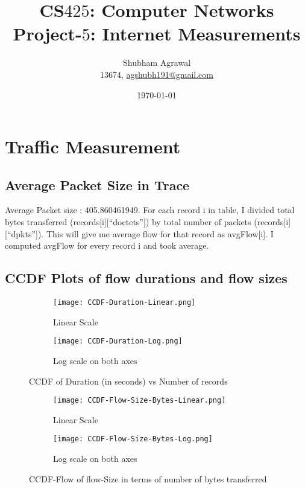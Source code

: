 \documentclass[11pt,a4paper,titlepage]{article}
\title{\blue CS$425$: Computer Networks \\
\blueb Project-$5$: Internet Measurements}
\author{Shubham Agrawal \\
13674, \href{mailto:agshubh191@gmail.com}{agshubh191@gmail.com}}
\date{\today}
\begin{document}
\maketitle
\section{Traffic Measurement}
\subsection{Average Packet Size in Trace}
Average Packet size : 405.860461949. For each record i in table, I divided total bytes transferred (records[i][“doctets”]) by total number of packets (records[i][“dpkts”]). This will give me average flow for that record as avgFlow[i]. I computed avgFlow for every record i and took average. 

\subsection{CCDF Plots of flow durations and flow sizes}
\begin{figure}[H]
\centering
\begin{subfigure}{.5\textwidth}
  \centering
  \texttt{[image: CCDF-Duration-Linear.png]}
  \caption{Linear Scale}
  \label{fig:sub1}
\end{subfigure}%
\begin{subfigure}{.5\textwidth}
  \centering
  \texttt{[image: CCDF-Duration-Log.png]}
  \caption{Log scale on both axes}
  \label{fig:sub2}
\end{subfigure}
\caption{CCDF of Duration (in seconds) vs Number of records}
\label{fig:test}
\end{figure}

\begin{figure}[H]
\centering
\begin{subfigure}{.5\textwidth}
  \centering
  \texttt{[image: CCDF-Flow-Size-Bytes-Linear.png]}
  \caption{Linear Scale}
  \label{fig:sub1}
\end{subfigure}%
\begin{subfigure}{.5\textwidth}
  \centering
  \texttt{[image: CCDF-Flow-Size-Bytes-Log.png]}
  \caption{Log scale on both axes}
  \label{fig:sub2}
\end{subfigure}
\caption{CCDF-Flow of flow-Size in terms of number of bytes transferred}
\label{fig:test}
\end{figure}
\end{document}
